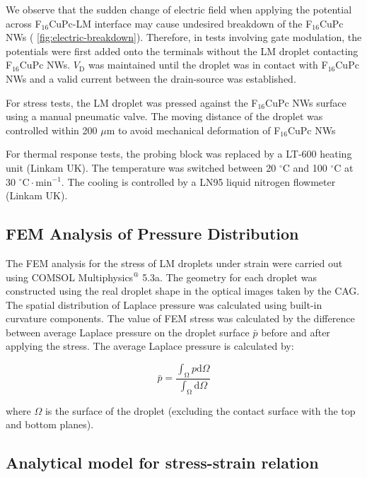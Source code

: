 We observe that the sudden change of electric field when applying the
potential across F\(_{\text{16}}\)CuPc-LM interface may cause undesired breakdown
of the F\(_{\text{16}}\)CuPc NWs ( \autoref{fig:electric-breakdown}). Therefore,
in tests involving gate modulation, the potentials were first added
onto the terminals without the LM droplet contacting F\(_{\text{16}}\)CuPc NWs.
\(V_{\mathrm{D}}\) was maintained until the droplet was in contact with
F\(_{\text{16}}\)CuPc NWs and a valid current between the drain-source was
established.

For stress tests, the LM droplet was pressed against the F\(_{\text{16}}\)CuPc
NWs surface using a manual pneumatic valve. The moving distance of the
droplet was controlled within 200 \(\mu \mathrm{m}\) to avoid mechanical
deformation of F\(_{\text{16}}\)CuPc NWs

For thermal response tests, the probing block was replaced by a LT-600
heating unit (Linkam UK). The temperature was switched between 20
\(^{\circ} \mathrm{C}\) and 100 \(^{\circ} \mathrm{C}\) at 30 \(^{\circ}
\mathrm{C} \cdot \mathrm{min}^{-1}\). The cooling is controlled by a
LN95 liquid nitrogen flowmeter (Linkam UK).

\subsection{FEM Analysis of Pressure Distribution}
\label{sec:small-orge90523c}
The FEM analysis for the stress of LM droplets under strain were
carried out using COMSOL Multiphysics\(^{\text{@}}\) 5.3a. The geometry for
each droplet was constructed using the real droplet shape in the
optical images taken by the CAG. The spatial distribution of
Laplace pressure was calculated using built-in curvature
components. The value of FEM stress was calculated by the
difference between average Laplace pressure on the droplet surface
\(\bar{p}\) before and after applying the stress. The average Laplace
pressure is calculated by:

\begin{equation}
\label{eq:small-7}
\bar{p} = {\displaystyle \frac{\int_{\mathrm{\Omega}} p \mathrm{d} \Omega}{\int_{\mathrm{\Omega}} \mathrm{d} \Omega}}
\end{equation}

where \(\Omega\) is the surface of the droplet (excluding the contact
surface with the top and bottom planes).

\subsection{Analytical model for stress-strain relation}
\label{sec:small-orgc12d6dd}

